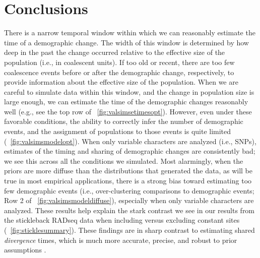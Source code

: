 

\section{Conclusions}

There is a narrow temporal window within which we can reasonably estimate the
time of a demographic change.
The width of this window is determined by how deep in the past the change
occurred relative to the effective size of the population (i.e., in coalescent
units).
If too old or recent, there are too few coalescence events before or after the
demographic change, respectively, to provide information about the effective
size of the population.
When we are careful to simulate data within this window, and the change in
population size is large enough, we can estimate the time of the demographic
changes reasonably well
(e.g., see the top row of \fig{}~\ref{fig:valsimsetimesopt}).
However, even under these favorable conditions, the ability to correctly infer
the number of demographic events, and the assignment of populations to those
events is quite limited
(\fig{}~\ref{fig:valsimsmodelopt}).
When only variable characters are analyzed (i.e., SNPs), estimates of the
timing and sharing of demographic changes are consistently bad; we see this
across all the conditions we simulated.
Most alarmingly, when the priors are more diffuse than the distributions that
generated the data, as will be true in most empirical applications, there is a
strong bias toward estimating too few demographic events
(i.e., over-clustering comparisons to demographic events;
Row 2 of \fig{}~\ref{fig:valsimsmodeldiffuse}),
especially when only variable characters are analyzed.
These results help explain the stark contrast we see in our results from the
stickleback RADseq data when including versus excluding constant sites
(\fig{}~\ref{fig:sticklesummary}).
These findings are in sharp contrast to estimating shared \emph{divergence}
times, which is much more accurate, precise, and robust to prior assumptions
\citep[\figs {};][]{Oaks2018ecoevolity,Oaks2018paic}.

